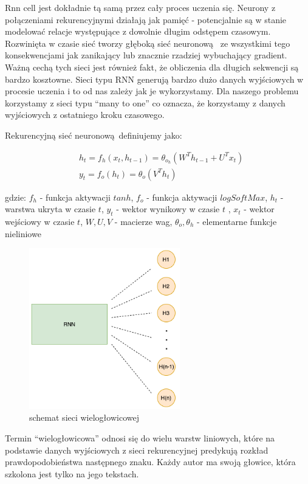 Rnn cell jest dokładnie tą samą przez cały proces
uczenia się. Neurony z połączeniami rekurencyjnymi działają jak pamięć - potencjalnie są w stanie modelować relacje
występujące z dowolnie długim odstępem czasowym. 
Rozwinięta w czasie sieć tworzy głęboką sieć neuronową 
ze wszystkimi tego konsekwencjami jak zanikający lub znacznie rzadziej wybuchający gradient. 
Ważną cechą tych sieci jest również fakt, że obliczenia dla długich sekwencji są bardzo kosztowne.
Sieci typu RNN generują bardzo dużo danych wyjściowych w procesie uczenia i to od nas zależy jak je 
wykorzystamy. Dla naszego problemu korzystamy z sieci typu ``many to one'' co oznacza, że korzystamy
z danych wyjściowych z ostatniego kroku czasowego.

\newpage
Rekurencyjną sieć neuronową definiujemy jako:

\begin{align}
  &h_t = f_h(x_t, h_{t-1}) = \theta_o_h(W^Th_{t-1} + U^Tx_t) \\ 
  &y_t = f_o(h_t) = \theta_o(V^Th_t)
\end{align}

gdzie: \newline
$f_h$ - funkcja aktywacji $tanh$, \newline
$f_o$ - funkcja aktywacji $logSoftMax$, \newline
$h_t$ - warstwa ukryta w czasie $t$, \newline
$y_t$ - wektor wynikowy w czasie $t$ , \newline
$x_t$ - wektor wejściowy w czasie $t$, \newline
$W, U, V$ - macierze wag, \newline
$\theta_o, \theta_h$ - elementarne funkcje nieliniowe \newline


\begin{figure}[H]
\centering
\includegraphics[height=7cm]{./images/multiheaded-rnn.png}
\caption{schemat sieci wielogłowicowej}
\label{fig:test5}
\end{figure}

Termin ``wielogłowicowa'' odnosi się do wielu warstw liniowych, które na podstawie danych wyjściowych z 
sieci rekurencyjnej predykują rozkład prawdopodobieństwa następnego znaku. Każdy autor ma swoją głowice, która 
szkolona jest tylko na jego tekstach.



